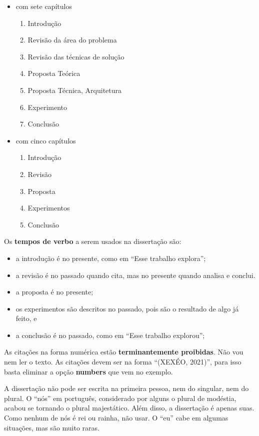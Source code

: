 \documentclass{article}
\begin{document}
\begin{itemize}
    \item com sete capítulos
    \begin{enumerate}
        \item Introdução
        \item Revisão da área do problema
        \item Revisão das técnicas de solução
        \item Proposta Teórica
        \item Proposta Técnica, Arquitetura
        \item Experimento 
        \item Conclusão
    \end{enumerate}
    \item com cinco capítulos
    \begin{enumerate}
        \item Introdução
        \item Revisão
        \item Proposta
        \item Experimentos
        \item Conclusão
    \end{enumerate}
\end{itemize}


Os \textbf{tempos de verbo} a serem usados na dissertação são:
\begin{itemize}
    \item a introdução é no presente, como em ``Esse trabalho explora'';
    \item a revisão é no passado quando cita, mas no presente quando analisa e conclui.
    \item a proposta é no presente;
    \item os experimentos são descritos no passado, pois são o resultado de algo já feito, e
    \item a conclusão é no passado, como em ``Esse trabalho explorou'';
\end{itemize}

As citações na forma numérica estão \textbf{terminantemente proibidas}. Não vou nem ler o texto. As citações devem ser na forma ``(XEXÉO, 2021)'', para isso basta eliminar a opção \textbf{numbers} que vem no exemplo.

A dissertação não pode ser escrita na primeira pessoa, nem do singular, nem do plural. O ``nós'' em português, considerado por alguns o plural de modéstia, acabou se tornando o plural majestático. Além disso, a dissertação é apenas suas. Como nenhum de nós é rei ou rainha, não usar. O ``eu'' cabe em algumas situações, mas são muito raras. 
\end{document}
